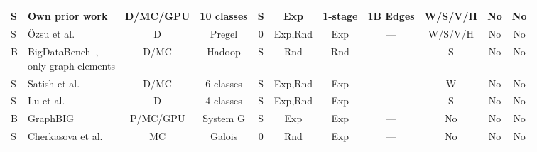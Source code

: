 \begin{tabular}[!tb]{|l|l|l|l|l|l|l|l|l|l|l|}
\hline
\hline
S & {\bf Own prior work}~\cite{DBLP:conf/ipps/GuoBVIMW14,DBLP:conf/ccgrid/GuoVIE15,DBLP:conf/sigmod/CapotaHIPEB14} & \multicolumn{1}{c|}{{\bf D/MC/GPU}} & \multicolumn{1}{c|}{{\bf 10 classes}} & \multicolumn{1}{c|}{{\bf S}} & \multicolumn{1}{c|}{{\bf Exp}} & \multicolumn{1}{c|}{{\bf 1-stage}} & \multicolumn{1}{c|}{{\bf 1B Edges}} & \multicolumn{1}{c|}{{\bf W/S/V/H}} & \multicolumn{1}{c|}{{\bf No}} & \multicolumn{1}{c|}{{\bf No}}\\ 
\hline
\hline
S & \"Ozsu et al.~\cite{DBLP:journals/pvldb/HanDAOWJ14} & \multicolumn{1}{c|}{D} & \multicolumn{1}{c|}{Pregel} & \multicolumn{1}{c|}{0} & \multicolumn{1}{c|}{Exp,Rnd} & \multicolumn{1}{c|}{Exp} & \multicolumn{1}{c|}{---} & \multicolumn{1}{c|}{W/S/V/H} & \multicolumn{1}{c|}{No} & \multicolumn{1}{c|}{No} \\ 
\hline
B & \pbox{5cm}{BigDataBench~\cite{DBLP:conf/wbdb/MingLGHYWZ13,DBLP:conf/hpca/WangZLZYHGJSZZLZLQ14}, \\only graph elements} & \multicolumn{1}{c|}{D/MC} & \multicolumn{1}{c|}{Hadoop} & \multicolumn{1}{c|}{S} & \multicolumn{1}{c|}{Rnd} & \multicolumn{1}{c|}{Rnd} & \multicolumn{1}{c|}{---} & \multicolumn{1}{c|}{S} & \multicolumn{1}{c|}{No} & \multicolumn{1}{c|}{No} \\ 
\hline
S & Satish et al.~\cite{DBLP:conf/sigmod/SatishSPSPHSYD14} & \multicolumn{1}{c|}{D/MC} & \multicolumn{1}{c|}{6 classes} & \multicolumn{1}{c|}{S} & \multicolumn{1}{c|}{Exp,Rnd} & \multicolumn{1}{c|}{Exp} & \multicolumn{1}{c|}{---} & \multicolumn{1}{c|}{W} & \multicolumn{1}{c|}{No} & \multicolumn{1}{c|}{No}\\ 
\hline
S & Lu et al.~\cite{DBLP:journals/pvldb/LuCYW14} & \multicolumn{1}{c|}{D} & \multicolumn{1}{c|}{4 classes} & \multicolumn{1}{c|}{S} & \multicolumn{1}{c|}{Exp,Rnd} & \multicolumn{1}{c|}{Exp} & \multicolumn{1}{c|}{---} & \multicolumn{1}{c|}{S} & \multicolumn{1}{c|}{No} & \multicolumn{1}{c|}{No} \\ 
\hline
B & GraphBIG~\cite{DBLP:conf/sc/NaiXTKL15} & \multicolumn{1}{c|}{P/MC/GPU} & \multicolumn{1}{c|}{System G} & \multicolumn{1}{c|}{S} & \multicolumn{1}{c|}{Exp} & \multicolumn{1}{c|}{Exp} & \multicolumn{1}{c|}{---} & \multicolumn{1}{c|}{No} & \multicolumn{1}{c|}{No} & \multicolumn{1}{c|}{No} \\ 
\hline
S & Cherkasova et al.~\cite{DBLP:conf/wosp/EisenmanCMCFK16} & \multicolumn{1}{c|}{MC} & \multicolumn{1}{c|}{Galois} & \multicolumn{1}{c|}{0} & \multicolumn{1}{c|}{Rnd} & \multicolumn{1}{c|}{Exp} & \multicolumn{1}{c|}{---} & \multicolumn{1}{c|}{No} & \multicolumn{1}{c|}{No} & \multicolumn{1}{c|}{No} \\ 

\end{tabular}
